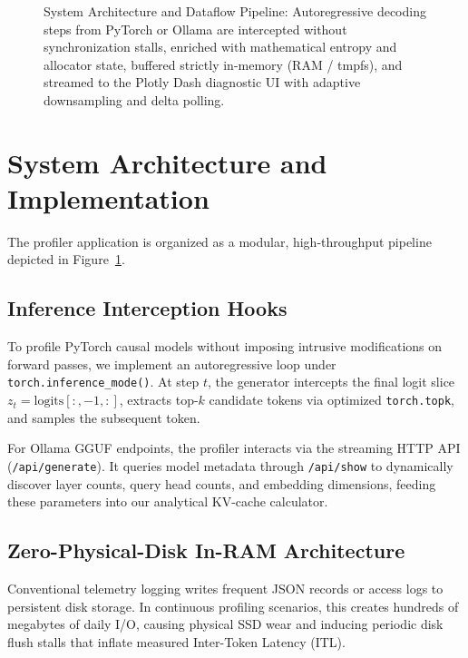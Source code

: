 \documentclass[10pt,twocolumn]{article}
\begin{document}
\begin{figure}[t]
{%
}
\caption{System Architecture and Dataflow Pipeline: Autoregressive decoding steps from PyTorch or Ollama are intercepted without synchronization stalls, enriched with mathematical entropy and allocator state, buffered strictly in-memory (RAM / tmpfs), and streamed to the Plotly Dash diagnostic UI with adaptive downsampling and delta polling.}
\label{fig:pipeline_architecture}
\end{figure}

\section{System Architecture and Implementation}
The profiler application is organized as a modular, high-throughput pipeline depicted in Figure~\ref{fig:pipeline_architecture}.

\subsection{Inference Interception Hooks}
To profile PyTorch causal models without imposing intrusive modifications on forward passes, we implement an autoregressive loop under \texttt{torch.inference\_mode()}. At step $t$, the generator intercepts the final logit slice $z_t = \text{logits}[:, -1, :]$, extracts top-$k$ candidate tokens via optimized \texttt{torch.topk}, and samples the subsequent token.

For Ollama GGUF endpoints, the profiler interacts via the streaming HTTP API (\texttt{/api/generate}). It queries model metadata through \texttt{/api/show} to dynamically discover layer counts, query head counts, and embedding dimensions, feeding these parameters into our analytical KV-cache calculator.

\subsection{Zero-Physical-Disk In-RAM Architecture}
Conventional telemetry logging writes frequent JSON records or access logs to persistent disk storage. In continuous profiling scenarios, this creates hundreds of megabytes of daily I/O, causing physical SSD wear and inducing periodic disk flush stalls that inflate measured Inter-Token Latency (ITL).
\end{document}
